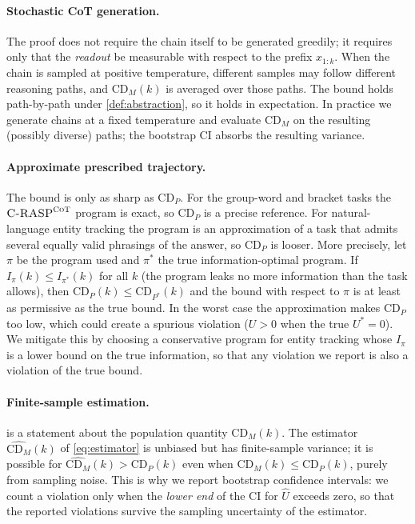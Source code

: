 \documentclass[11pt]{article}
\newcommand{\CDP}{\mathrm{CD}_{P}}
\newcommand{\CDM}{\mathrm{CD}_{M}}
\newcommand{\stepk}{k}
\newcommand{\CRASPCoT}{\textsc{C-RASP}^{\textsc{CoT}}}
\begin{document}
\paragraph{Stochastic CoT generation.}
The proof does not require the chain itself to be generated greedily; it
requires only that the \emph{readout} be measurable with respect to the prefix
$x_{1{:}\stepk}$. When the chain is sampled at positive temperature, different
samples may follow different reasoning paths, and $\CDM(\stepk)$ is averaged
over those paths. The bound holds path-by-path under \cref{def:abstraction}, so
it holds in expectation. In practice we generate chains at a fixed temperature
and evaluate $\CDM$ on the resulting (possibly diverse) paths; the bootstrap CI
absorbs the resulting variance.

\paragraph{Approximate prescribed trajectory.}
The bound is only as sharp as $\CDP$. For the group-word and bracket tasks the
$\CRASPCoT$ program is exact, so $\CDP$ is a precise reference. For
natural-language entity tracking the program is an approximation of a task that
admits several equally valid phrasings of the answer, so $\CDP$ is looser. More
precisely, let $\pi$ be the program used and $\pi^{*}$ the true
information-optimal program. If $I_{\pi}(\stepk) \le I_{\pi^{*}}(\stepk)$ for
all $\stepk$ (the program leaks no more information than the task allows), then
$\CDP(\stepk) \le \mathrm{CD}_{P^{*}}(\stepk)$ and the bound with respect to
$\pi$ is at least as permissive as the true bound. In the worst case the
approximation makes $\CDP$ too low, which could create a spurious violation
($U>0$ when the true $U^{*}=0$). We mitigate this by choosing a conservative
program for entity tracking whose $I_{\pi}$ is a lower bound on the true
information, so that any violation we report is also a violation of the true
bound.

\paragraph{Finite-sample estimation.}
 is a statement about the population quantity $\CDM(\stepk)$.
The estimator $\widehat{\CDM}(\stepk)$ of \cref{eq:estimator} is unbiased but
has finite-sample variance; it is possible for $\widehat{\CDM}(\stepk) >
\CDP(\stepk)$ even when $\CDM(\stepk)\le\CDP(\stepk)$, purely from sampling
noise. This is why we report bootstrap confidence intervals: we count a
violation only when the \emph{lower end} of the CI for $\widehat{U}$ exceeds
zero, so that the reported violations survive the sampling uncertainty of the
estimator.
\end{document}
